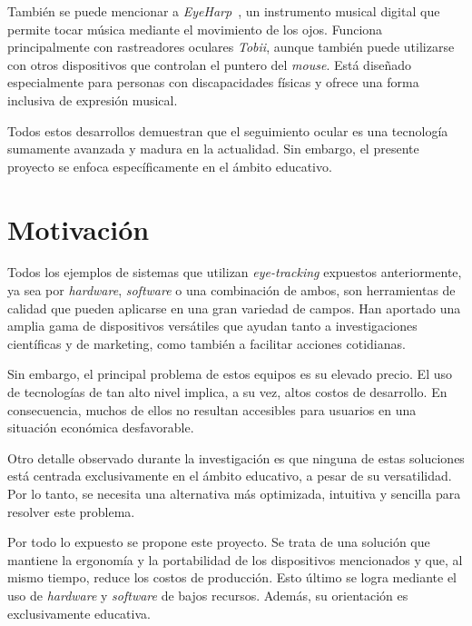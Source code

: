 También se puede mencionar a \emph{EyeHarp}~\cite{eyeharp}, un instrumento musical digital que permite tocar música mediante el movimiento de los ojos. Funciona principalmente con rastreadores oculares \emph{Tobii}, aunque también puede utilizarse con otros dispositivos que controlan el puntero del \emph{mouse}. Está diseñado especialmente para personas con discapacidades físicas y ofrece una forma inclusiva de expresión musical.

Todos estos desarrollos demuestran que el seguimiento ocular es una tecnología sumamente avanzada y madura en la actualidad. Sin embargo, el presente proyecto se enfoca específicamente en el ámbito educativo.

\section{Motivación}

Todos los ejemplos de sistemas que utilizan \emph{eye-tracking} expuestos anteriormente, ya sea por \emph{hardware}, \emph{software} o una combinación de ambos, son herramientas de calidad que pueden aplicarse en una gran variedad de campos. Han aportado una amplia gama de dispositivos versátiles que ayudan tanto a investigaciones científicas y de marketing, como también a facilitar acciones cotidianas.

Sin embargo, el principal problema de estos equipos es su elevado precio. El uso de tecnologías de tan alto nivel implica, a su vez, altos costos de desarrollo. En consecuencia, muchos de ellos no resultan accesibles para usuarios en una situación económica desfavorable.

Otro detalle observado durante la investigación es que ninguna de estas soluciones está centrada exclusivamente en el ámbito educativo, a pesar de su versatilidad. Por lo tanto, se necesita una alternativa más optimizada, intuitiva y sencilla para resolver este problema.

Por todo lo expuesto se propone este proyecto. Se trata de una solución que mantiene la ergonomía y la portabilidad de los dispositivos mencionados y que, al mismo tiempo, reduce los costos de producción. Esto último se logra mediante el uso de \emph{hardware} y \emph{software} de bajos recursos. Además, su orientación es exclusivamente educativa.

